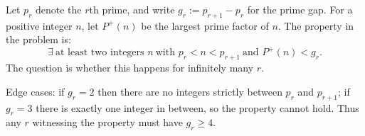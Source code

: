 Let $p_r$ denote the $r$th prime, and write $g_r:=p_{r+1}-p_r$ for the prime gap.
For a positive integer $n$, let $P^+(n)$ be the largest prime factor of $n$.
The property in the problem is:
\[
\exists\ \text{at least two integers }n\ \text{with }p_r<n<p_{r+1}\ \text{and }P^+(n)<g_r.
\]
The question is whether this happens for infinitely many $r$.

Edge cases: if $g_r=2$ then there are no integers strictly between $p_r$ and $p_{r+1}$; if $g_r=3$ there is exactly one integer in between, so the property cannot hold. Thus any $r$ witnessing the property must have $g_r\ge 4$.
